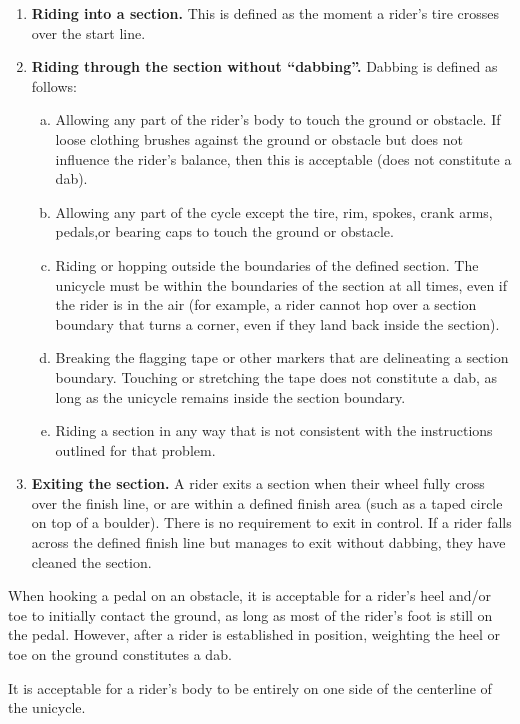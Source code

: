 \begin{enumerate}
\item \textbf{Riding into a section.} This is defined as the moment a rider's tire crosses over the start line.
\item \textbf{Riding through the section without ``dabbing''.} Dabbing is defined as follows:
	\begin{enumerate}[a.]
	\item Allowing any part of the rider's body to touch the ground or obstacle. 
	If loose clothing brushes against the ground or obstacle but does not influence the rider's balance, then this is acceptable (does not constitute a dab).
	\item Allowing any part of the cycle except the tire, rim, spokes, crank arms, pedals,or bearing caps to touch the ground or obstacle.
	\item Riding or hopping outside the boundaries of the defined section.
	The unicycle must be within the boundaries of the section at all times, even if the rider is in the air (for example, a rider cannot hop over a section boundary that turns a corner, even if they land back inside the section).
	\item Breaking the flagging tape or other markers that are delineating a section boundary. 
	Touching or stretching the tape does not constitute a dab, as long as the unicycle remains inside the section boundary.
	\item Riding a section in any way that is not consistent with the instructions outlined for that problem.
	\end{enumerate}
\item \textbf{Exiting the section.} A rider exits a section when their wheel fully cross over the finish line, or are within a defined finish area (such as a taped circle on top of a boulder). 
There is no requirement to exit in control.
If a rider falls across the defined finish line but manages to exit without dabbing, they have cleaned the section. %
\end{enumerate}

When hooking a pedal on an obstacle, it is acceptable for a rider's heel and/or toe to initially contact the ground, as long as most of the rider's foot is still on the pedal. 
However, after a rider is established in position, weighting the heel or toe on the ground constitutes a dab.

It is acceptable for a rider's body to be entirely on one side of the centerline of the unicycle.

